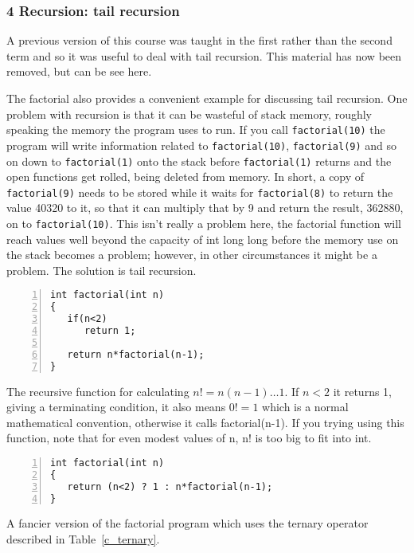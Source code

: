 \documentclass[11pt,a4paper]{scrartcl}
\begin{document}
\subsubsection*{4 Recursion: tail recursion}
     
A previous version of this course was taught in the first rather than
the second term and so it was useful to deal with tail recursion. This
material has now been removed, but can be see here.

The factorial also provides a convenient example for discussing tail
recursion. One problem with recursion is that it can be wasteful of
stack memory, roughly speaking the memory the program uses to run. If
you call \texttt{factorial(10)} the program will write information
related to \texttt{factorial(10)}, \texttt{factorial(9)} and so on
down to \texttt{factorial(1)} onto the stack before
\texttt{factorial(1)} returns and the open functions get rolled, being
deleted from memory. In short, a copy of \texttt{factorial(9)} needs
to be stored while it waits for \texttt{factorial(8)} to return the
value 40320 to it, so that it can multiply that by 9 and return the
result, 362880, on to \texttt{factorial(10)}. This isn't really a
problem here, the factorial function will reach values well beyond the
capacity of int long long before the memory use on the stack becomes a
problem; however, in other circumstances it might be a problem. The
solution is tail recursion.


\begin{table}[b]
\begin{lstlisting}[numbers=left]
int factorial(int n)
{
   if(n<2)
      return 1;

   return n*factorial(n-1);
}

\end{lstlisting}
\caption{The recursive function for calculating $n!=n(n-1)\ldots 1$. If $n<2$ it returns 1, giving a terminating condition, it also means $0!=1$ which is a normal mathematical convention, otherwise it calls factorial(n-1). If you trying using this function, note that for even modest values of n, n! is too big to fit into int.\label{c_factorial}}
\end{table}


\begin{table}
\begin{lstlisting}[numbers=left]
int factorial(int n)
{
   return (n<2) ? 1 : n*factorial(n-1);
}

\end{lstlisting}
\caption{A fancier version of the factorial program which uses the ternary operator described in Table~\ref{c_ternary}.\label{c_factorial_fancy}}
\end{table}
\end{document}
